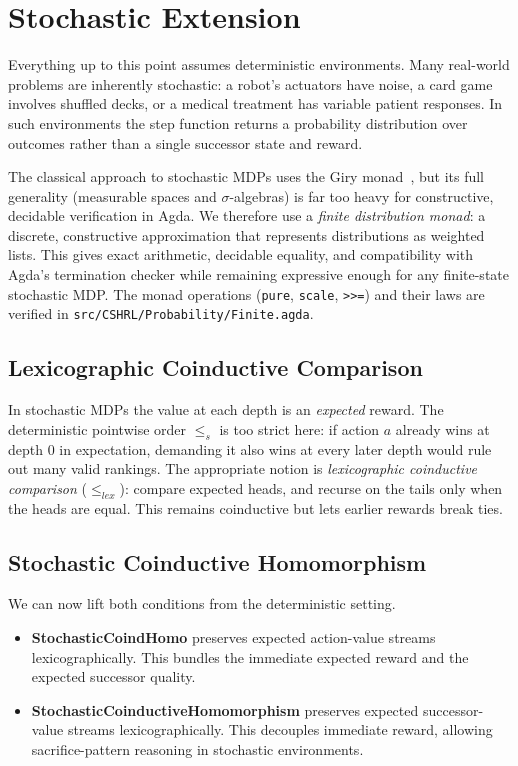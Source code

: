 \documentclass[runningheads]{llncs}
\newcommand{\fpath}[1]{\nolinkurl{#1}}
\begin{document}
\section{Stochastic Extension}\label{sec:stochastic}

Everything up to this point assumes deterministic environments. Many real-world problems are inherently stochastic: a robot's actuators have noise, a card game involves shuffled decks, or a medical treatment has variable patient responses. In such environments the step function returns a probability distribution over outcomes rather than a single successor state and reward.

The classical approach to stochastic MDPs uses the Giry monad~\cite{Giry1982}, but its full generality (measurable spaces and $\sigma$-algebras) is far too heavy for constructive, decidable verification in Agda. We therefore use a \emph{finite distribution monad}: a discrete, constructive approximation that represents distributions as weighted lists. This gives exact arithmetic, decidable equality, and compatibility with Agda's termination checker while remaining expressive enough for any finite-state stochastic MDP. The monad operations (\texttt{pure}, \texttt{scale}, \texttt{>>=}) and their laws are verified in \fpath{src/CSHRL/Probability/Finite.agda}.

\subsection{Lexicographic Coinductive Comparison}

In stochastic MDPs the value at each depth is an \emph{expected} reward. The deterministic pointwise order $\leq_s$ is too strict here: if action $a$ already wins at depth 0 in expectation, demanding it also wins at every later depth would rule out many valid rankings. The appropriate notion is \emph{lexicographic coinductive comparison} ($\leq_{lex}$): compare expected heads, and recurse on the tails only when the heads are equal. This remains coinductive but lets earlier rewards break ties.

\subsection{Stochastic Coinductive Homomorphism}

We can now lift both conditions from the deterministic setting.

\begin{itemize}
\item \textbf{StochasticCoindHomo} preserves expected action-value streams lexicographically. This bundles the immediate expected reward and the expected successor quality.
\item \textbf{StochasticCoinductiveHomomorphism} preserves expected successor-value streams lexicographically. This decouples immediate reward, allowing sacrifice-pattern reasoning in stochastic environments.
\end{itemize}
\end{document}
